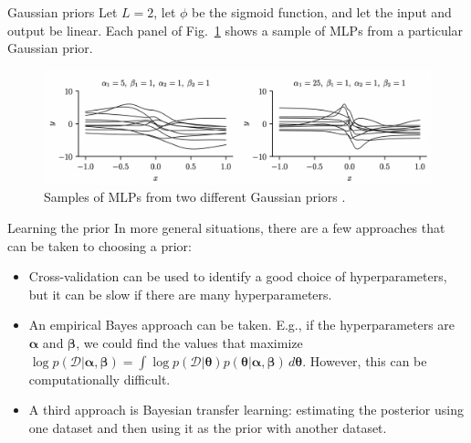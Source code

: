 \documentclass{beamer}
\begin{document}
\begin{frame}{Gaussian priors}
    Let $L = 2$, let $\phi$ be the sigmoid function, and let the input and output be linear. Each panel of Fig.~\ref{fig:mlp_priors} shows a sample of MLPs from a particular Gaussian prior.
    \begin{figure}
        \centering
        \includegraphics[width=\textwidth]{mlp_priors}
        \caption{Samples of MLPs from two different Gaussian priors \cite{pml2Book}.}
        \label{fig:mlp_priors}
    \end{figure}
\end{frame}

\begin{frame}{Learning the prior}
    In more general situations, there are a few approaches that can be taken to choosing a prior:
    \begin{itemize}
        \item Cross-validation can be used to identify a good choice of hyperparameters, but it can be slow if there are many hyperparameters.
        \item An empirical Bayes approach can be taken. E.g., if the hyperparameters are $\boldsymbol{\alpha}$ and $\boldsymbol{\beta}$, we could find the values that maximize $\log p(\mathcal{D} | \boldsymbol{\alpha}, \boldsymbol{\beta}) = \int \log p(\mathcal{D} | \boldsymbol{\theta})p(\boldsymbol{\theta} | \boldsymbol{\alpha}, \boldsymbol{\beta})\,d\boldsymbol{\theta}$. However, this can be computationally difficult.
        \item A third approach is Bayesian transfer learning: estimating the posterior using one dataset and then using it as the prior with another dataset.
    \end{itemize}
\end{frame}
\end{document}
